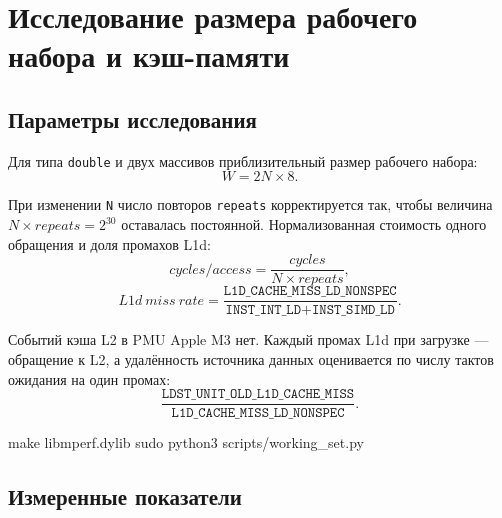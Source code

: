 \chapter{Исследование размера рабочего набора и кэш-памяти}
\label{ch:working-set}

\section{Параметры исследования}

Для типа \texttt{double} и двух массивов приблизительный размер рабочего набора:
$$
W = 2N \times 8.
$$

При изменении \texttt{N} число повторов \texttt{repeats} корректируется так, чтобы величина $N \times \mathit{repeats} = 2^{30}$ оставалась постоянной.
Нормализованная стоимость одного обращения и доля промахов L1d:
$$
\mathit{cycles/access} = \frac{\mathit{cycles}}{N \times \mathit{repeats}},
$$
$$
\mathit{L1d\ miss\ rate} = \frac{\texttt{L1D\_CACHE\_MISS\_LD\_NONSPEC}}{\texttt{INST\_INT\_LD} + \texttt{INST\_SIMD\_LD}}.
$$

Событий кэша L2 в PMU Apple M3 нет.
Каждый промах L1d при загрузке --- обращение к L2, а удалённость источника данных оценивается по числу тактов ожидания на один промах:
$$
\frac{\texttt{LDST\_UNIT\_OLD\_L1D\_CACHE\_MISS}}{\texttt{L1D\_CACHE\_MISS\_LD\_NONSPEC}}.
$$

\begin{commands}
make libmperf.dylib
sudo python3 scripts/working_set.py
\end{commands}


\section{Измеренные показатели}


